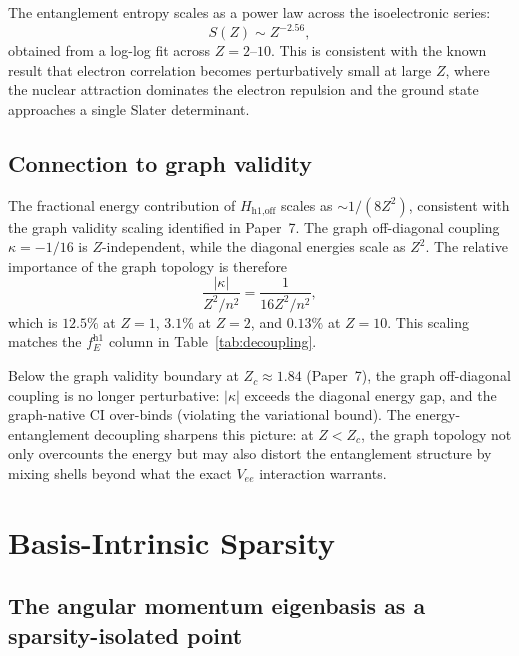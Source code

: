 \documentclass[twocolumn,pra,amsmath,amssymb,superscriptaddress]{revtex4-2}
\begin{document}
The entanglement entropy scales as a power law across the
isoelectronic series:
\begin{equation}
  S(Z) \sim Z^{-2.56},
  \label{eq:scaling}
\end{equation}
obtained from a log-log fit across $Z = 2$--$10$.  This is
consistent with the known result that electron correlation becomes
perturbatively small at large $Z$, where the nuclear attraction
dominates the electron repulsion and the ground state approaches
a single Slater determinant.

\subsection{Connection to graph validity}

The fractional energy contribution of $H_{\text{h1,off}}$ scales
as $\sim 1/(8Z^2)$, consistent with the graph validity scaling
identified in Paper~7.  The graph off-diagonal coupling
$\kappa = -1/16$ is $Z$-independent, while the diagonal energies
scale as $Z^2$.  The relative importance of the graph topology
is therefore
\begin{equation}
  \frac{|\kappa|}{Z^2/n^2} = \frac{1}{16 Z^2/n^2},
\end{equation}
which is $12.5\%$ at $Z = 1$, $3.1\%$ at $Z = 2$, and $0.13\%$
at $Z = 10$.  This scaling matches the $f_E^{\text{h1}}$ column
in Table~\ref{tab:decoupling}.

Below the graph validity boundary at $Z_c \approx 1.84$
(Paper~7), the graph off-diagonal coupling is no longer
perturbative: $|\kappa|$ exceeds the diagonal energy gap, and
the graph-native CI over-binds (violating the variational bound).
The energy-entanglement decoupling sharpens this picture: at
$Z < Z_c$, the graph topology not only overcounts the energy but
may also distort the entanglement structure by mixing shells
beyond what the exact $V_{ee}$ interaction warrants.

\section{Basis-Intrinsic Sparsity}
\label{sec:sparsity}

\subsection{The angular momentum eigenbasis as a sparsity-isolated point}
\end{document}
